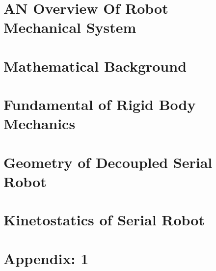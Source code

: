 \documentclass[11pt]{report}
\begin{document}
\tableofcontents



\chapter{AN Overview Of Robot Mechanical System}


\chapter{Mathematical Background}


\chapter{Fundamental of Rigid Body Mechanics}


\chapter{Geometry of Decoupled Serial Robot}


\chapter{Kinetostatics of Serial Robot}


\chapter{Appendix: 1}

\end{document}
